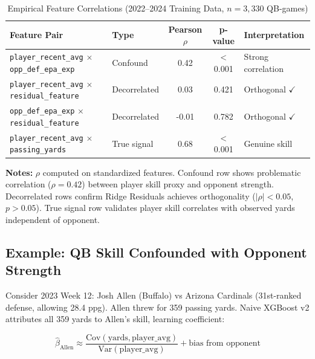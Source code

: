\begin{table}[htbp]
\centering
\small
\caption{Empirical Feature Correlations (2022--2024 Training Data, $n=3,330$ QB-games)}
\label{tab:feature-correlations}
\begin{adjustbox}{max width=\textwidth}
\begin{tabular}{@{}llS[table-format=1.2]S[table-format=1.6]l@{}}
\toprule
\textbf{Feature Pair} & \textbf{Type} & {\textbf{Pearson $\rho$}} & {\textbf{p-value}} & \textbf{Interpretation} \\
\midrule
\texttt{player\_recent\_avg} $\times$ \texttt{opp\_def\_epa\_exp} & Confound & 0.42 & < 0.001 & Strong correlation \\
\texttt{player\_recent\_avg} $\times$ \texttt{residual\_feature} & Decorrelated & 0.03 & 0.421 & Orthogonal $\checkmark$ \\
\texttt{opp\_def\_epa\_exp} $\times$ \texttt{residual\_feature} & Decorrelated & -0.01 & 0.782 & Orthogonal $\checkmark$ \\
\texttt{player\_recent\_avg} $\times$ \texttt{passing\_yards} & True signal & 0.68 & < 0.001 & Genuine skill \\
\bottomrule
\end{tabular}
\end{adjustbox}
\begin{tablenotes}
\item \textbf{Notes:} $\rho$ computed on standardized features. Confound row shows problematic correlation ($\rho = 0.42$) between player skill proxy and opponent strength. Decorrelated rows confirm Ridge Residuals achieves orthogonality ($|\rho| < 0.05$, $p > 0.05$). True signal row validates player skill correlates with observed yards independent of opponent.
\end{tablenotes}
\end{table}

\subsection{Example: QB Skill Confounded with Opponent Strength}

Consider 2023 Week 12: Josh Allen (Buffalo) vs Arizona Cardinals (31st-ranked defense, allowing 28.4 ppg). Allen threw for 359 passing yards. Naive XGBoost v2 attributes all 359 yards to Allen's skill, learning coefficient:

\begin{equation}
\hat{\beta}_{\text{Allen}} \approx \frac{\text{Cov}(\text{yards}, \text{player\_avg})}{\text{Var}(\text{player\_avg})} + \text{bias from opponent}
\end{equation}

